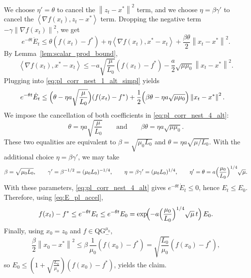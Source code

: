 \documentclass{article}
\newcommand{\bpar}[1]{\left(#1\right)}
\newcommand{\norm}[1]{\left\lVert#1\right\rVert}
\newcommand{\dotprod}[1]{\left< #1\right>}
\newcommand{\qginff}[1]{\text{QG}_{-}^{#1}}
\theoremstyle{plain}
\theoremstyle{definition}
\theoremstyle{remark}
\begin{document}
We choose $\eta'=\theta$ to cancel the $\norm{z_t-x^\ast}^2$ term, and we choose $\eta=\beta\gamma'$ to cancel the
$\dotprod{\nabla f(x_t),z_t-x^\ast}$ term. Dropping the negative term $-\gamma\norm{\nabla f(x_t)}^2$, we get
\begin{equation}\label{eq:pl_corr_nest_1_alt_simpl}
    e^{-\theta t}\dot{E}_t
    \le \theta(f(x_t)-f^\ast)
    + \eta \dotprod{\nabla f(x_t), x^\ast-x_t}
    + \frac{\beta\theta}{2}\norm{x_t-x^\ast}^2.
\end{equation}
By Lemma~\ref{lem:scalar_prod_bound},
\[
\dotprod{\nabla f(x_t), x^\ast-x_t}
\le  -a \sqrt{\frac{\mu}{L_0}}(f(x_t)-f^\ast) - \frac{a}{2}\sqrt{\mu \mu_0}\norm{x_t-x^\ast}^2.
\]
Plugging into \eqref{eq:pl_corr_nest_1_alt_simpl} yields
\begin{align}
    e^{-\theta t}\dot{E}_t
    &\le \Bigl(\theta-\eta a\sqrt{\frac{\mu}{L_0}}\Bigr)(f(x_t)-f^\ast)
    + \frac12\Bigl(\beta\theta-\eta a\sqrt{\mu\mu_0}\Bigr)\norm{x_t-x^\ast}^2.\label{eq:pl_corr_nest_4_alt}
\end{align}
We impose the cancellation of both coefficients in \eqref{eq:pl_corr_nest_4_alt}:
\[
\theta=\eta a\sqrt{\frac{\mu}{L_0}}
\qquad\text{and}\qquad
\beta\theta=\eta a\sqrt{\mu\mu_0}.
\]
These two equalities are equivalent to $\beta=\sqrt{\mu_0L_0}$ and $\theta=\eta a\sqrt{\mu/L_0}$.
With the additional choice $\eta=\beta\gamma'$, we may take
\[
\beta=\sqrt{\mu_0L_0},\qquad
\gamma'=\beta^{-1/2}=(\mu_0L_0)^{-1/4},\qquad
\eta=\beta\gamma'=(\mu_0L_0)^{1/4},
\qquad
\eta'=\theta=a\Bigl(\frac{\mu_0}{L_0}\Bigr)^{1/4}\sqrt{\mu}.
\]
With these parameters, \eqref{eq:pl_corr_nest_4_alt} gives $e^{-\theta t}\dot E_t\le 0$, hence $E_t\le E_0$.
Therefore, using \eqref{eq:E_pl_accel},
\[
f(x_t)-f^\ast \le e^{-\theta t}E_t \le e^{-\theta t}E_0
= \exp\!\Bigl(-a\Bigl(\frac{\mu_0}{L_0}\Bigr)^{1/4}\sqrt{\mu}\,t\Bigr)\,E_0.
\]
Finally, using $x_0 = z_0$ and $f\in\qginff{\mu_0}$,
\[
\frac{\beta}{2}\norm{x_0-x^\ast}^2
\le \beta\,\frac{1}{\mu_0}(f(x_0)-f^\ast)
= \sqrt{\frac{L_0}{\mu_0}}(f( x_0)-f^\ast),
\]
so $E_0\le \bpar{1+\sqrt{\frac{L_0}{\mu_0}}}(f( x_0)-f^\ast)$, yields the claim.
\end{document}

